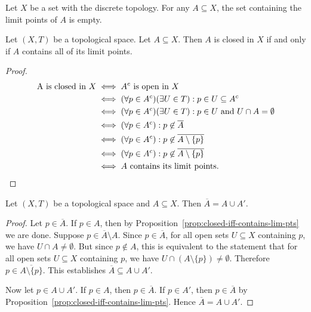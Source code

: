 \begin{example}
    Let $X$ be a set with the discrete topology. For any $A \subseteq X$, the set containing the limit points of $A$ is empty.
\end{example}

\begin{proposition}\label{prop:closed-iff-contains-lim-pts}
    Let $(X,T)$ be a topological space. Let $A \subseteq X$. Then $A$ is closed in $X$ if and only if $A$ contains all of its limit points.
\end{proposition}
    \begin{proof}
        \begin{equation*}
        \begin{split}
            \text{A is closed in $X$}
            &\iff \text{$A^c$ is open in $X$} \\
            &\iff \text{$(\forall p \in A^c)(\exists U \in T):p \in U \subseteq A^c$} \\
            &\iff \text{$(\forall p \in A^c)(\exists U \in T):p \in U $ and $ U \cap A= \emptyset$} \\
            &\iff \text{$(\forall p \in A^c):p \not\in \overline{A}$} \\
            &\iff \text{$(\forall p \in A^c):p \not\in \overline{A \setminus \{p\}}$} \\
            &\iff \text{$(\forall p \in A^c):p \not\in \overline{A \setminus \{p\}}$} \\
            &\iff \text{$A$ contains its limit points.} \qedhere 
        \end{split}
        \end{equation*}
    \end{proof}

\begin{proposition}
    Let $(X,T)$ be a topological space and $A \subseteq X$. Then $\overline{A} = A \cup A'$.
\end{proposition}
    \begin{proof}
        Let $p \in \overline{A}$. If $p \in A$, then by Proposition~\ref{prop:closed-iff-contains-lim-pts} we are done. Suppose $p \in \overline{A} \setminus A$. Since $p \in \overline{A}$, for all open sets $U \subseteq X$ containing $p$, we have $U \cap A \neq \emptyset$. But since $p \not\in A$, this is equivalent to the statement that for all open sets $U \subseteq X$ containing $p$, we have $U \cap (A\setminus\{p\}) \neq \emptyset$. Therefore $p \in \overline{A \setminus \{p\}}$. This establishes $\overline{A} \subseteq A \cup  A'$.

        Now let $p \in A \cup A'$. If $p \in A$, then $p \in \overline{A}$. If $p \in A'$, then $p \in \overline{A}$ by Proposition~\ref{prop:closed-iff-contains-lim-pts}. Hence $\overline{A} = A \cup A'$.
    \end{proof}

